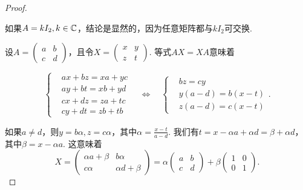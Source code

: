   \begin{proof}
    \begin{enumerate*}[label=(\alph*),
      itemjoin=\\\hspace*{\parindent}]
       \item 如果$A=kI_2,k\in\mathbb C$，结论是显然的，因为任意矩阵都与$kI_2$可交换.
       \item 设$A=\begin{pmatrix}
         a & b \\
         c & d
       \end{pmatrix}$，且令$X=\begin{pmatrix}
         x & y \\
         z & t
       \end{pmatrix}$. 等式$AX=XA$意味着
    \end{enumerate*}
       \[
         \left\{
           \begin{aligned}
             & ax + bz = xa + yc \\
             & ay + bt = xb + yd \\
             & cx + dz = za + tc \\
             & cy + dt = zb + tb
           \end{aligned}
         \right.\quad \Leftrightarrow \quad
         \left\{
           \begin{aligned}
             & bz = cy \\
             & y(a-d) = b(x-t) \\
             & z(a-d) = c(x-t)
           \end{aligned}
         \right..
       \]

       如果$a\ne d$，则$y=b\alpha,z=c\alpha$，其中$\alpha=\frac{x-t}{a-d}$. 我们有$t=x-\alpha a+\alpha d=\beta+\alpha d$，其中$\beta=x-\alpha a$. 这意味着
       \[
         X = \begin{pmatrix}
           \alpha a + \beta & b\alpha \\
           c\alpha & \alpha d + \beta
         \end{pmatrix} =
         \alpha \begin{pmatrix}
           a & b \\
           c & d
         \end{pmatrix} + \beta
         \begin{pmatrix}
           1 & 0 \\
           0 & 1
         \end{pmatrix}.
       \]


\end{proof}
